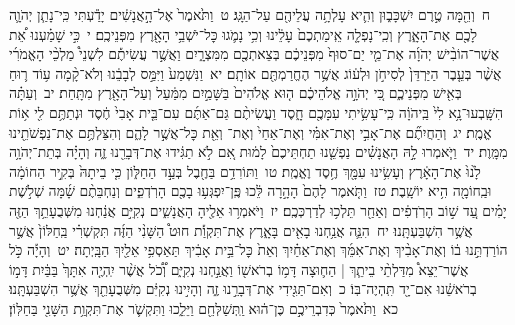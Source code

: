 \documentclass[18pt]{article}
\newcommand{\kri}[1]{\Afootnote{#1}}	%
\begin{document}
 {\loc ח~}וְהֵ֖מָּה טֶ֣רֶם יִשְׁכָּב֑וּן וְהִ֛יא עָלְתָ֥ה עֲלֵיהֶ֖ם עַל־הַגָּֽג׃ \startlock
 {\loc ט~}וַתֹּ֙אמֶר֙ אֶל־הָ֣אֲנָשִׁ֔ים יָדַ֕עְתִּי כִּֽי־נָתַ֧ן יְהֹוָ֛ה לָכֶ֖ם אֶת־הָאָ֑רֶץ וְכִֽי־נָפְלָ֤ה אֵֽימַתְכֶם֙ עָלֵ֔ינוּ וְכִ֥י נָמֹ֛גוּ כׇּל־יֹשְׁבֵ֥י הָאָ֖רֶץ מִפְּנֵיכֶֽם׃ \startlock
 {\loc י~}כִּ֣י שָׁמַ֗עְנוּ אֵ֠ת אֲשֶׁר־הוֹבִ֨ישׁ יְהֹוָ֜ה אֶת־מֵ֤י יַם־סוּף֙ מִפְּנֵיכֶ֔ם בְּצֵאתְכֶ֖ם מִמִּצְרָ֑יִם וַאֲשֶׁ֣ר עֲשִׂיתֶ֡ם לִשְׁנֵי֩ מַלְכֵ֨י הָאֱמֹרִ֜י אֲשֶׁ֨ר בְּעֵ֤בֶר הַיַּרְדֵּן֙ לְסִיחֹ֣ן וּלְע֔וֹג אֲשֶׁ֥ר הֶחֱרַמְתֶּ֖ם אוֹתָֽם׃ \startlock
 {\loc יא~}וַנִּשְׁמַע֙ וַיִּמַּ֣ס לְבָבֵ֔נוּ וְלֹא־קָ֨מָה ע֥וֹד ר֛וּחַ בְּאִ֖ישׁ מִפְּנֵיכֶ֑ם כִּ֚י יְהֹוָ֣ה אֱלֹהֵיכֶ֔ם ה֤וּא אֱלֹהִים֙ בַּשָּׁמַ֣יִם מִמַּ֔עַל וְעַל־הָאָ֖רֶץ מִתָּֽחַת׃ \startlock
 {\loc יב~}וְעַתָּ֗ה הִשָּֽׁבְעוּ־נָ֥א לִי֙ בַּֽיהֹוָ֔ה כִּֽי־עָשִׂ֥יתִי עִמָּכֶ֖ם חָ֑סֶד וַעֲשִׂיתֶ֨ם גַּם־אַתֶּ֜ם עִם־בֵּ֤ית אָבִי֙ חֶ֔סֶד וּנְתַתֶּ֥ם לִ֖י א֥וֹת אֱמֶֽת׃ \startlock
 {\loc יג~}וְהַחֲיִתֶ֞ם אֶת־אָבִ֣י וְאֶת־אִמִּ֗י וְאֶת־אַחַי֙ וְאֶת־ \edtext{(אחותי)}{\kri{קרי: אַחְיוֹתַ֔י}}  וְאֵ֖ת כׇּל־אֲשֶׁ֣ר לָהֶ֑ם וְהִצַּלְתֶּ֥ם אֶת־נַפְשֹׁתֵ֖ינוּ מִמָּֽוֶת׃ \startlock
 {\loc יד~}וַיֹּ֧אמְרוּ לָ֣הּ הָאֲנָשִׁ֗ים נַפְשֵׁ֤נוּ תַחְתֵּיכֶם֙ לָמ֔וּת אִ֚ם לֹ֣א תַגִּ֔ידוּ אֶת־דְּבָרֵ֖נוּ זֶ֑ה וְהָיָ֗ה בְּתֵת־יְהֹוָ֥ה לָ֙נוּ֙ אֶת־הָאָ֔רֶץ וְעָשִׂ֥ינוּ עִמָּ֖ךְ חֶ֥סֶד וֶאֱמֶֽת׃ \startlock
 {\loc טו~}וַתּוֹרִדֵ֥ם בַּחֶ֖בֶל בְּעַ֣ד הַחַלּ֑וֹן כִּ֤י בֵיתָהּ֙ בְּקִ֣יר הַחוֹמָ֔ה וּבַֽחוֹמָ֖ה הִ֥יא יוֹשָֽׁבֶת׃ \startlock
 {\loc טז~}וַתֹּ֤אמֶר לָהֶם֙ הָהָ֣רָה לֵּ֔כוּ פֶּֽן־יִפְגְּע֥וּ בָכֶ֖ם הָרֹֽדְפִ֑ים וְנַחְבֵּתֶ֨ם שָׁ֜מָּה שְׁלֹ֣שֶׁת יָמִ֗ים עַ֚ד שׁ֣וֹב הָרֹֽדְפִ֔ים וְאַחַ֖ר תֵּלְכ֥וּ לְדַרְכְּכֶֽם׃ \startlock
 {\loc יז~}וַיֹּאמְר֥וּ אֵלֶ֖יהָ הָאֲנָשִׁ֑ים נְקִיִּ֣ם אֲנַ֔חְנוּ מִשְּׁבֻעָתֵ֥ךְ הַזֶּ֖ה אֲשֶׁ֥ר הִשְׁבַּעְתָּֽנוּ׃ \startlock
 {\loc יח~}הִנֵּ֛ה אֲנַ֥חְנוּ בָאִ֖ים בָּאָ֑רֶץ אֶת־תִּקְוַ֡ת חוּט֩ הַשָּׁנִ֨י הַזֶּ֜ה תִּקְשְׁרִ֗י בַּֽחַלּוֹן֙ אֲשֶׁ֣ר הוֹרַדְתֵּ֣נוּ ב֔וֹ וְאֶת־אָבִ֨יךְ וְאֶת־אִמֵּ֜ךְ וְאֶת־אַחַ֗יִךְ וְאֵת֙ כׇּל־בֵּ֣ית אָבִ֔יךְ תַּאַסְפִ֥י אֵלַ֖יִךְ הַבָּֽיְתָה׃ \startlock
 {\loc יט~}וְהָיָ֡ה כֹּ֣ל אֲשֶׁר־יֵצֵא֩ מִדַּלְתֵ֨י בֵיתֵ֧ךְ  |  הַח֛וּצָה דָּמ֥וֹ בְרֹאשׁ֖וֹ וַאֲנַ֣חְנוּ נְקִיִּ֑ם וְ֠כֹ֠ל אֲשֶׁ֨ר יִֽהְיֶ֤ה אִתָּךְ֙ בַּבַּ֔יִת דָּמ֣וֹ בְרֹאשֵׁ֔נוּ אִם־יָ֖ד תִּֽהְיֶה־בּֽוֹ׃ \startlock
 {\loc כ~}וְאִם־תַּגִּ֖ידִי אֶת־דְּבָרֵ֣נוּ זֶ֑ה וְהָיִ֣ינוּ נְקִיִּ֔ם מִשְּׁבֻעָתֵ֖ךְ אֲשֶׁ֥ר הִשְׁבַּעְתָּֽנוּ׃ \startlock
 {\loc כא~}וַתֹּ֙אמֶר֙ כְּדִבְרֵיכֶ֣ם כֶּן־ה֔וּא וַֽתְּשַׁלְּחֵ֖ם וַיֵּלֵ֑כוּ וַתִּקְשֹׁ֛ר אֶת־תִּקְוַ֥ת הַשָּׁנִ֖י בַּחַלּֽוֹן׃ \startlock
\end{document}
